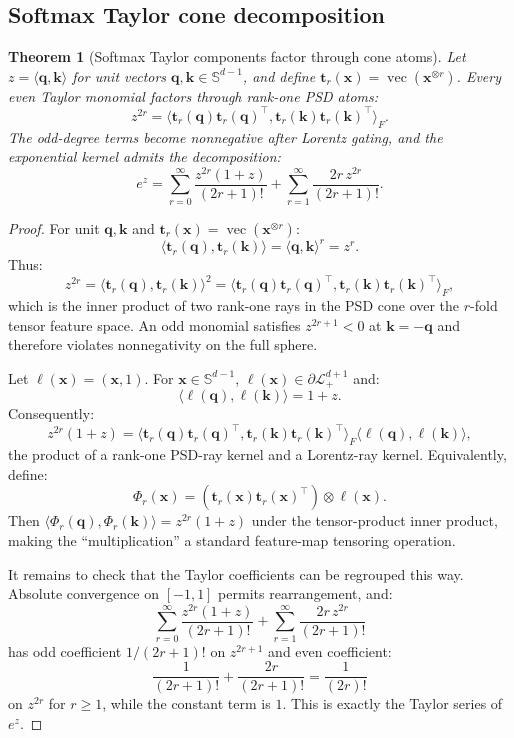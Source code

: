 \documentclass{article}
\newcommand{\1}{\bm{1}}
\newcommand{\lrangle}[1]{\langle#1\rangle}
\def\vk{{\bm{k}}}
\def\vq{{\bm{q}}}
\def\vt{{\bm{t}}}
\def\vx{{\bm{x}}}
\def\gL{{\mathcal{L}}}
\newtheorem{theorem}{Theorem}
\theoremstyle{definition}
\begin{document}
\subsection{Softmax Taylor cone decomposition}

\begin{theorem}[Softmax Taylor components factor through cone atoms]
  \label{thm:softmax-cone-decomp}
  Let $z=\lrangle{\vq,\vk}$ for unit vectors $\vq,\vk\in\mathbb{S}^{d-1}$, and define
  $\vt_r(\vx)=\operatorname{vec}(\vx^{\otimes r})$. Every even Taylor monomial factors through
  rank-one PSD atoms:
  \[
    z^{2r}
    =
    \lrangle{\vt_r(\vq)\vt_r(\vq)^\top,
      \vt_r(\vk)\vt_r(\vk)^\top}_F.
  \]
  The odd-degree terms become nonnegative after Lorentz gating, and the exponential kernel admits
  the decomposition:
  \[
    e^z
    =
    \sum_{r=0}^{\infty}\frac{z^{2r}(1+z)}{(2r+1)!}
    +
    \sum_{r=1}^{\infty}\frac{2r\,z^{2r}}{(2r+1)!}.
  \]
\end{theorem}

\begin{proof}

For unit $\vq,\vk$ and $\vt_r(\vx)=\operatorname{vec}(\vx^{\otimes r})$:
\[
  \lrangle{\vt_r(\vq),\vt_r(\vk)}
  = \lrangle{\vq,\vk}^r
  = z^r .
\]
Thus:
\[
  z^{2r}
  =
  \lrangle{\vt_r(\vq),\vt_r(\vk)}^2
  =
  \lrangle{\vt_r(\vq)\vt_r(\vq)^\top,
    \vt_r(\vk)\vt_r(\vk)^\top}_F,
\]
which is the inner product of two rank-one rays in the PSD cone over the $r$-fold tensor feature
space. An odd monomial satisfies $z^{2r+1}<0$ at $\vk=-\vq$ and therefore violates
nonnegativity on the full sphere.

Let $\ell(\vx)=(\vx,1)$. For $\vx\in\mathbb{S}^{d-1}$, $\ell(\vx)\in\partial\gL^{d+1}_{+}$ and:
\[
  \lrangle{\ell(\vq),\ell(\vk)} = 1+z.
\]
Consequently:
\[
  z^{2r}(1+z)
  =
  \lrangle{\vt_r(\vq)\vt_r(\vq)^\top,
    \vt_r(\vk)\vt_r(\vk)^\top}_F
  \lrangle{\ell(\vq),\ell(\vk)},
\]
the product of a rank-one PSD-ray kernel and a Lorentz-ray kernel. Equivalently, define:
\[
  \Phi_r(\vx)
  =
  \left(\vt_r(\vx)\vt_r(\vx)^\top\right)\otimes \ell(\vx).
\]
Then $\lrangle{\Phi_r(\vq),\Phi_r(\vk)}=z^{2r}(1+z)$ under the tensor-product inner product, making
the ``multiplication'' a standard feature-map tensoring operation.

It remains to check that the Taylor coefficients can be regrouped this way. Absolute convergence on
$[-1,1]$ permits rearrangement, and:
\[
  \sum_{r=0}^{\infty}\frac{z^{2r}(1+z)}{(2r+1)!}
  +
  \sum_{r=1}^{\infty}\frac{2r\,z^{2r}}{(2r+1)!}
\]
has odd coefficient $1/(2r+1)!$ on $z^{2r+1}$ and even coefficient:
\[
  \frac{1}{(2r+1)!}+\frac{2r}{(2r+1)!}
  = \frac{1}{(2r)!}
\]
on $z^{2r}$ for $r\ge1$, while the constant term is $1$. This is exactly the Taylor series of
$e^z$.

\end{proof}
\end{document}
